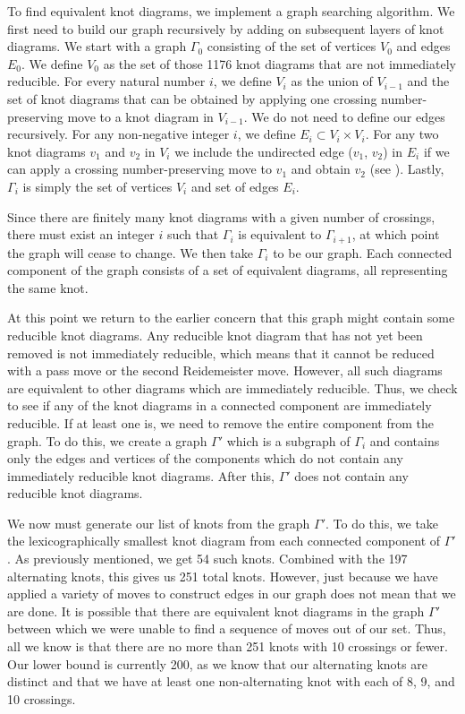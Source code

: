 \begin{paper}

To find equivalent knot diagrams, we implement a graph searching algorithm.
We first need to build our graph recursively by adding on subsequent layers of
knot diagrams.
We start with a graph $\Gamma_0$ consisting of the set of vertices $V_0$ and
edges $E_0$.
We define $V_0$ as the set of those 1176 knot diagrams that are not immediately
reducible.
For every natural number $i$, we define $V_i$ as the union of $V_{i-1}$ and the
set of knot diagrams that can be obtained by applying one crossing
number-preserving move to a knot diagram in $V_{i-1}$.
We do not need to define our edges recursively.
For any non-negative integer $i$, we define $E_i\subset V_i\times V_i$.
For any two knot diagrams $v_1$ and $v_2$ in $V_i$ we include the undirected
edge ($v_1$, $v_2$) in $E_i$ if we can apply a crossing number-preserving move
to $v_1$ and obtain $v_2$ (see \figMoves).
Lastly, $\Gamma_i$ is simply the set of vertices $V_i$ and set of edges $E_i$.

Since there are finitely many knot diagrams with a given number of crossings,
there must exist an integer $i$ such that $\Gamma_i$ is equivalent to
$\Gamma_{i+1}$, at which point the graph will cease to change.
We then take $\Gamma_i$ to be our graph.
Each connected component of the graph consists of a set of equivalent diagrams,
all representing the same knot.

At this point we return to the earlier concern that this graph might contain
some reducible knot diagrams.
Any reducible knot diagram that has not yet been removed is not immediately
reducible, which means that it cannot be reduced with a pass move or the second
Reidemeister move.
However, all such diagrams are equivalent to other diagrams which are
immediately reducible.
Thus, we check to see if any of the knot diagrams in a connected component are
immediately reducible.
If at least one is, we need to remove the entire component from the graph.
To do this, we create a graph $\Gamma'$ which is a subgraph of $\Gamma_i$ and
contains only the edges and vertices of the components which do not contain any
immediately reducible knot diagrams.
After this, $\Gamma'$ does not contain any reducible knot diagrams.

We now must generate our list of knots from the graph $\Gamma'$.
To do this, we take the lexicographically smallest knot diagram from each
connected component of $\Gamma'$.
As previously mentioned, we get 54 such knots.
Combined with the 197 alternating knots, this gives us 251 total knots.
However, just because we have applied a variety of moves to construct edges in
our graph does not mean that we are done.
It is possible that there are equivalent knot diagrams in the graph $\Gamma'$
between which we were unable to find a sequence of moves out of our set.
Thus, all we know is that there are no more than 251 knots with 10 crossings or
fewer.
Our lower bound is currently 200, as we know that our alternating knots are
distinct and that we have at least one non-alternating knot with each of 8, 9,
and 10 crossings.


\end{paper}
